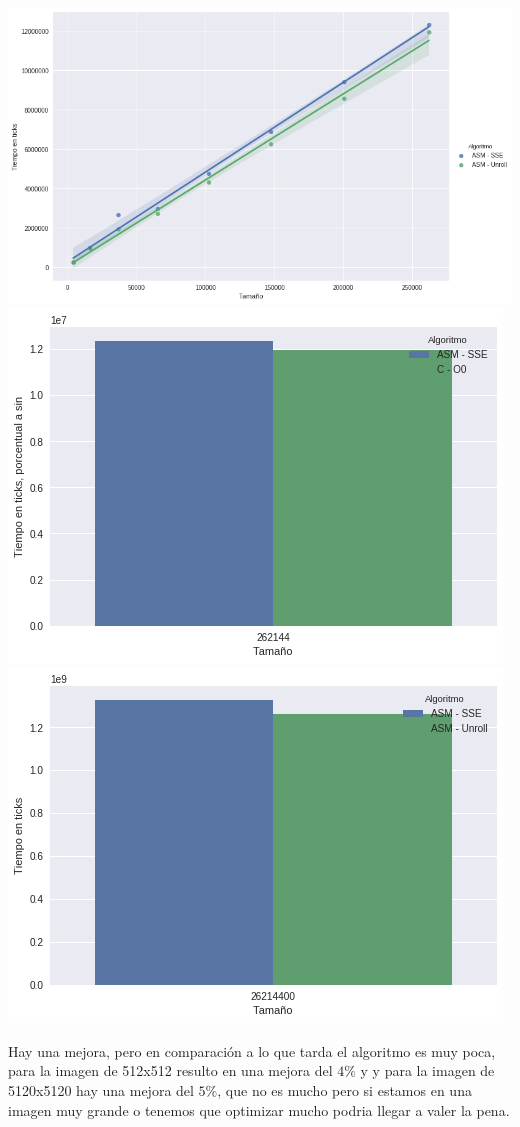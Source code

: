 \begin{center} 
	\includegraphics[scale=0.5]{img/maxCloser_Unroll_compare.png}
	\includegraphics[scale=0.5]{img/maxCloser_Unroll_small.png} %
	\includegraphics[scale=0.5]{img/maxCloser_Unroll_big.png} %
\end{center}

Hay una mejora, pero en comparación a lo que tarda el algoritmo es muy poca, para la imagen de 512x512 resulto en una mejora del $4\%$ y y para la imagen de 5120x5120 hay una mejora del $5\%$, que no es mucho pero si estamos en una imagen muy grande o tenemos que optimizar mucho podria llegar a valer la pena. 